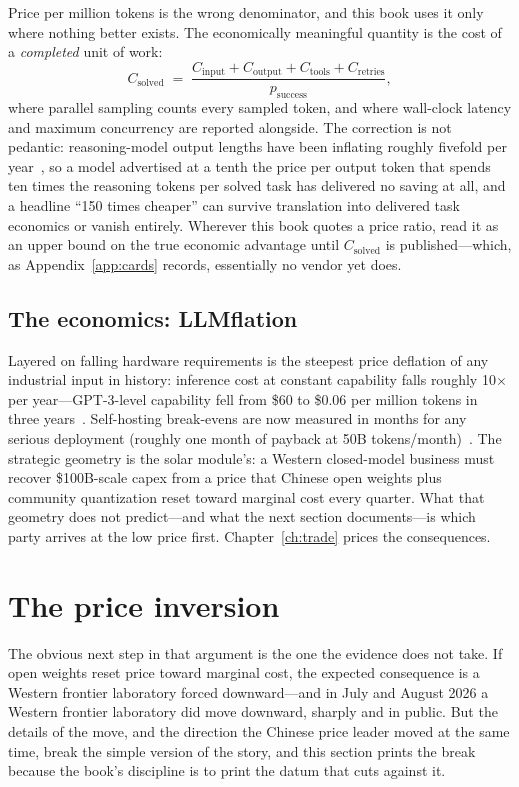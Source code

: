 Price per million tokens is the wrong denominator, and this book uses it only where nothing better exists. The economically meaningful quantity is the cost of a \emph{completed} unit of work:
\[
C_{\text{solved}} \;=\; \frac{C_{\text{input}} + C_{\text{output}} + C_{\text{tools}} + C_{\text{retries}}}{p_{\text{success}}},
\]
where parallel sampling counts every sampled token, and where wall-clock latency and maximum concurrency are reported alongside. The correction is not pedantic: reasoning-model output lengths have been inflating roughly fivefold per year~\cite{epoch-output}, so a model advertised at a tenth the price per output token that spends ten times the reasoning tokens per solved task has delivered no saving at all, and a headline ``150 times cheaper'' can survive translation into delivered task economics or vanish entirely. Wherever this book quotes a price ratio, read it as an upper bound on the true economic advantage until $C_{\text{solved}}$ is published---which, as Appendix~\ref{app:cards} records, essentially no vendor yet does.

\subsection{The economics: LLMflation}
\label{sec:llmflation}

Layered on falling hardware requirements is the steepest price deflation of any industrial input in history: inference cost at constant capability falls roughly 10$\times$ per year---GPT-3-level capability fell from \$60 to \$0.06 per million tokens in three years~\cite{llmflation}. Self-hosting break-evens are now measured in months for any serious deployment (roughly one month of payback at 50B tokens/month)~\cite{selfhost}. The strategic geometry is the solar module's: a Western closed-model business must recover \$100B-scale capex from a price that Chinese open weights plus community quantization reset toward marginal cost every quarter. What that geometry does not predict---and what the next section documents---is which party arrives at the low price first. Chapter~\ref{ch:trade} prices the consequences.

\section{The price inversion}
\label{sec:price-inversion}

The obvious next step in that argument is the one the evidence does not take. If open weights reset price toward marginal cost, the expected consequence is a Western frontier laboratory forced downward---and in July and August 2026 a Western frontier laboratory did move downward, sharply and in public. But the details of the move, and the direction the Chinese price leader moved at the same time, break the simple version of the story, and this section prints the break because the book's discipline is to print the datum that cuts against it.

